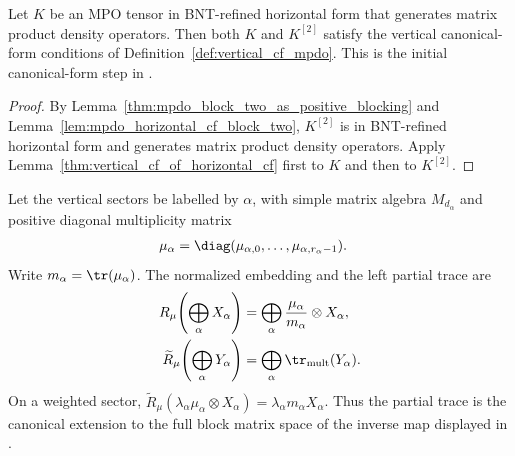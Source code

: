 \begin{lemma}
    \label{thm:mpdo_vertical_cf_before_after_block_two}
    \leanok
    Let $K$ be an MPO tensor in BNT-refined horizontal form that
    generates matrix product density operators. Then both $K$ and $K^{[2]}$
    satisfy the
    vertical canonical-form conditions of
    Definition~\ref{def:vertical_cf_mpdo}.
    This is the initial canonical-form step in
    \cite[Appendix~C.4, lines~1951--1956]{Cirac2016MPDO_arXiv}.
\end{lemma}

\begin{proof}\leanok
    By Lemma~\ref{thm:mpdo_block_two_as_positive_blocking} and
    Lemma~\ref{lem:mpdo_horizontal_cf_block_two}, $K^{[2]}$ is in
    BNT-refined horizontal form and generates matrix product density operators. Apply
    Lemma~\ref{thm:vertical_cf_of_horizontal_cf} first to $K$ and then to
    $K^{[2]}$.
\end{proof}

\begin{definition}
    \label{def:mpdo_normalized_vertical_sector_maps}
    \leanok
    Let the vertical sectors be labelled by $\alpha$, with simple matrix
    algebra $M_{d_\alpha}$ and positive diagonal multiplicity matrix
    \begin{align}
        \mu_\alpha
         & =\diag(\mu_{\alpha,0},\ldots,\mu_{\alpha,r_\alpha-1}).
        \notag
    \end{align}
    Write $m_\alpha=\tr(\mu_\alpha)$. The normalized
    embedding and the left partial trace are
    \begin{align}
        R_\mu\!\left(\bigoplus_\alpha X_\alpha\right)
         & =\bigoplus_\alpha
        \frac{\mu_\alpha}{m_\alpha}\otimes X_\alpha,
        \notag                                              \\
        \widetilde R_\mu\!\left(\bigoplus_\alpha Y_\alpha\right)
         & =\bigoplus_\alpha \tr_{\mathrm{mult}}(Y_\alpha).
        \notag
    \end{align}
    On a weighted sector,
    $\widetilde R_\mu(\lambda_\alpha\mu_\alpha\otimes X_\alpha)
        =\lambda_\alpha m_\alpha X_\alpha$.
    Thus the partial trace is the canonical extension to the full block
    matrix space of the inverse map displayed in
    \cite[Appendix~C.4, lines~1957--1971]{Cirac2016MPDO_arXiv}.
\end{definition}

